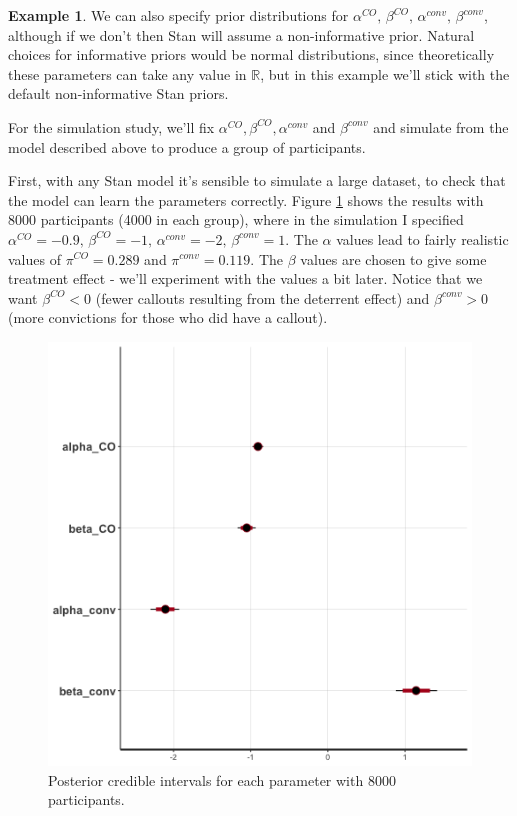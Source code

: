 \documentclass[
  openany]{book}
\theoremstyle{definition}
\theoremstyle{definition}
\newtheorem{example}{Example}[chapter]
\theoremstyle{definition}
\theoremstyle{definition}
\theoremstyle{remark}
\begin{document}
\begin{example}
We can also specify prior distributions for \(\alpha^{CO},\,\beta^{CO},\,\alpha^{conv},\,\beta^{conv}\), although if we don't then Stan will assume a non-informative prior. Natural choices for informative priors would be normal distributions, since theoretically these parameters can take any value in \(\mathbb{R}\), but in this example we'll stick with the default non-informative Stan priors.

For the simulation study, we'll fix \(\alpha^{CO},\beta^{CO}, \alpha^{conv}\) and \(\beta^{conv}\) and simulate from the model described above to produce a group of participants.

First, with any Stan model it's sensible to simulate a large dataset, to check that the model can learn the parameters correctly. Figure \ref{fig:check8000} shows the results with 8000 participants (4000 in each group), where in the simulation I specified \(\alpha^{CO}=-0.9,\,\beta^{CO}=-1,\,\alpha^{conv}=-2,\,\beta^{conv}=1\). The \(\alpha\) values lead to fairly realistic values of \(\pi^{CO} = 0.289\) and \(\pi^{conv} = 0.119\). The \(\beta\) values are chosen to give some treatment effect - we'll experiment with the values a bit later. Notice that we want \(\beta^{CO}<0\) (fewer callouts resulting from the deterrent effect) and \(\beta^{conv}>0\) (more convictions for those who did have a callout).

\begin{figure}
\centering
\includegraphics{images/stan_np8000.png}
\caption{\label{fig:check8000}Posterior credible intervals for each parameter with 8000 participants.}
\end{figure}


\end{example}
\end{document}
